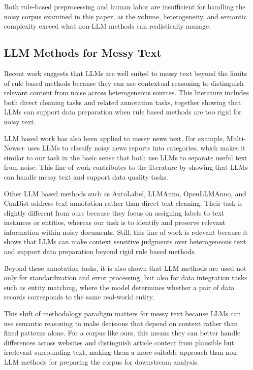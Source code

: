 \documentclass{article}
\begin{document}
Both rule-based preprocessing and human labor are insufficient for handling the noisy corpus examined in this paper, as the volume, heterogeneity, and semantic complexity exceed what non-LLM methods can realistically manage.

\subsection{LLM Methods for Messy
Text}\label{llm-methods-for-messy-text}


Recent work suggests that LLMs are well suited to messy text beyond the limits of rule based methods because they can use contextual reasoning to distinguish relevant content from noise across heterogeneous sources. This literature includes both direct cleaning tasks and related annotation tasks, together showing that LLMs can support data preparation when rule based methods are too rigid for noisy text.

LLM based work has also been applied to messy news text. For example, Multi-News+ uses LLMs to classify noisy news reports into categories, which makes it similar to our task in the basic sense that both use LLMs to separate useful text from noise. This line of work contributes to the literature by showing that LLMs can handle messy text and support data quality tasks.

Other LLM based methods such as AutoLabel, LLMAnno, OpenLLMAnno, and CanDist address text annotation rather than direct text cleaning. Their task is slightly different from ours because they focus on assigning labels to text instances or entities, whereas our task is to identify and preserve relevant information within noisy documents. Still, this line of work is relevant because it shows that LLMs can make context sensitive judgments over heterogeneous text and support data preparation beyond rigid rule based methods.

Beyond these annotation tasks, it is also shown that LLM methods are used not only for standardization and error processing, but also for data integration tasks such as entity matching, where the model determines whether a pair of data records corresponds to the same real-world entity.

This shift of methodology paradigm matters for messy text because LLMs can use semantic reasoning to make decisions that depend on context rather than fixed patterns alone. For a corpus like ours, this means they can better handle differences across websites and distinguish article content from plausible but irrelevant surrounding text, making them a more suitable approach than non LLM methods for preparing the corpus for downstream analysis.
\end{document}
